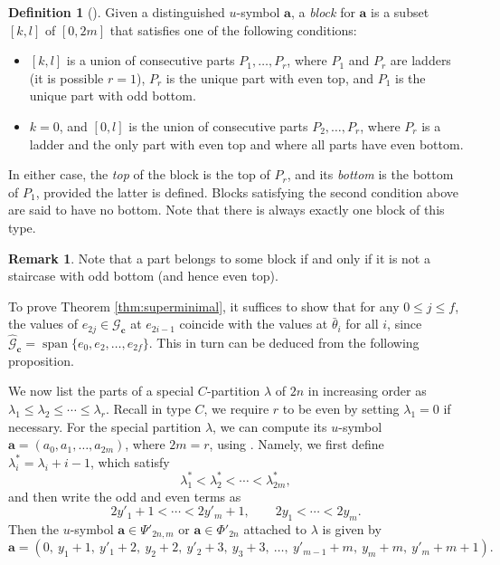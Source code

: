 \documentclass{amsart}
\theoremstyle{definition}
\newtheorem{definition}[theorem]{Definition}
\newtheorem{remark}[theorem]{Remark}
\DeclareMathOperator{\spn}{span}
\newcommand{\cG}{\mathcal{G}}
\newcommand{\ba}{\mathbf{a}}
\newcommand{\bc}{{\mathbf{c}}}
\newcommand{\0}{\mathcal{O}}
\begin{document}
\begin{definition}[{\cite[Definition 4.1]{Achar-Sage-special}}] \label{defn:block_C}
	Given a distinguished $u$-symbol $\ba$, a \emph{block} for $\ba$ is a subset
	$[k,l]$ of $[0,2m]$ that satisfies one of the following conditions:
	\begin{itemize}
		\item $[k,l]$ is a union of consecutive parts $P_1, \ldots, P_r$, where
		$P_1$ and $P_r$ are ladders (it is possible $r = 1$), $P_r$ is the unique part with even top, and
		$P_1$ is the unique part with odd bottom. 
		\item $k = 0$, and $[0,l]$ is the union of consecutive parts $P_2, \ldots,
		P_r$, where $P_r$ is a ladder and the only part with even top and where
		all parts have even bottom. 
	\end{itemize}
	In either case, the \emph{top} of the block is the top of $P_r$, and
	its \emph{bottom} is the bottom of $P_1$, provided the latter is
	defined.  Blocks satisfying the second condition above are said to
	have no bottom.  Note that there is always exactly one block of this
	type.
\end{definition}

\begin{remark}\label{rmk:staircase}
	Note that a part belongs to some block if and only if
	it is not a staircase with odd bottom (and hence even top). 
\end{remark}



To prove Theorem \ref{thm:superminimal}, it suffices to show that for any $0 \le j \le f$, the values of $e_{2j} \in \cG_\bc$ at $e_{2i-1}$ coincide with the values at $\bar{\theta}_{i}$ for all $i$, since $\hat{\cG}_\bc =\spn \{e_0, e_2, \ldots, e_{2f}\} $. This in turn can be deduced from the following proposition. 

We now list the parts of a special $C$-partition $\lambda$ of $2n$ in increasing order as $\lambda_1 \le \lambda_2 \le \cdots \le \lambda_r$. Recall in type $C$, we require $r$ to be even by setting $\lambda_1=0$ if necessary.
For the special partition $\lambda$, we can compute its $u$-symbol $\ba = (a_0, a_1, \ldots, a_{2m})$, where $2m = r$, using \cite[\S\,11.6]{Lusztig:icc}. Namely, we first define $\lambda_i^* = \lambda_i + i -1$, which satisfy
\[ \lambda_1^* < \lambda_2^* < \cdots < \lambda_{2m}^*, \]
and then write the odd and even terms as
\[
	2y'_1+1<\cdots <2y'_m+1,
	\qquad
	2y_1<\cdots <2y_m.
\]
Then the $u$-symbol $\ba \in \Psi'_{2n,m}$ or $\ba \in \Phi'_{2n}$ attached to $\lambda$ is given by
\begin{equation} \label{eq:part2symbol}
	\ba = (0,~y_1+1, ~ y'_1+2, ~ y_2+2, ~ y'_2+3, ~y_3+3, ~\ldots, ~y'_{m-1}+m, ~y_m+m, ~y'_m+m+1). 
\end{equation}
\end{document}

